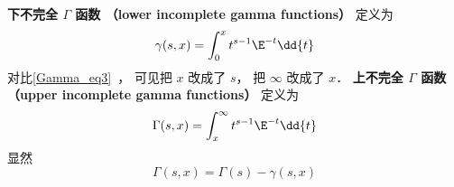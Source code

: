 

\textbf{下不完全 $\Gamma$ 函数 （lower incomplete gamma functions）} 定义为
\begin{equation}
\gamma(s, x) = \int_0^x t^{s-1}\E^{-t} \dd{t}
\end{equation}
对比\autoref{Gamma_eq3}~， 可见把 $x$ 改成了 $s$， 把 $\infty$ 改成了 $x$．
\textbf{上不完全 $\Gamma$ 函数 （upper incomplete gamma functions）} 定义为
\begin{equation}
\Gamma(s, x) = \int_x^\infty t^{s-1}\E^{-t} \dd{t}
\end{equation}
显然
\begin{equation}
\Gamma(s, x) = \Gamma(s) - \gamma(s, x)
\end{equation}

